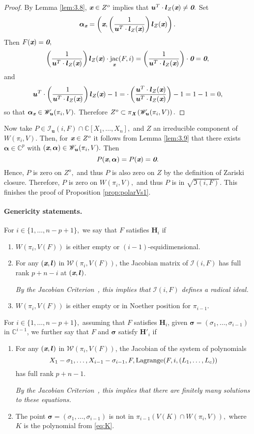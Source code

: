 \documentclass[a4paper]{article}
\def\bz{\textit{\textbf{0}}}
\def\Xb{\textit{\textbf{X}}}
\def\ub{{\bm u}}
\def\lb{{\bm l}}
\def\ax{\bm \alpha_{\xb}}
\def\xb{\textit{\textbf{x}}}
\DeclareMathOperator{\jac}{jac}
\DeclareMathOperator{\lag}{Lagrange}
\def\C{\mathbb{C}}
\def\Wi{W(\pi_i,V)}
\def\Iir{\sqrt{\mathfrak{I}(i,F)}}
\def\ji{\jac_{\xb}(F,i)}
\def\lagF{{\bm\lag}(F,i,(L_1,\hdots,L_c))}
\def\Iil{\mathscr{I}_{\ub}(i,F)}
\def\Wil{\mathscr{W}_{\ub}(\pi_i,V)}
\begin{document}
%
\begin{proof}
By Lemma \ref{lem:3.8}, $\xb \in Z^o$ implies that $\ub^T \cdot \lb_{Z}(\xb) \not = \bz.$ Set
\[
\bm \alpha_{\xb} = \left(\xb,\left(\frac{1}{\ub^T\cdot \lb_{Z}(\xb)}\right)\lb_{Z}(\xb)\right). 
\]
Then $F(\xb)=\bz,$
\begin{align*}
    \left(\frac{1}{\ub^T\cdot \lb_{Z}(\xb)}\right)\lb_{Z}(\xb)\cdot \ji = \left(\frac{1}{\ub^T\cdot \lb_{Z}(\xb)}\right)\cdot \bz = \bz,
\end{align*}
and
\[
\ub^T\cdot\left(\frac{1}{\ub^T\cdot \lb_{Z}(\xb)}\right)\lb_{Z}(\xb)-1 =
    \cdot\left(\frac{\ub^T\cdot\lb_{Z}(\xb)}{\ub^T\cdot \lb_{Z}(\xb)}\right)-1=1-1=0,
\]
so that $\ax \in \Wil.$ Therefore $Z^o \subset \pi_{\Xb}\left(\Wil\right).$
%
\end{proof}
%
%
%
\noindent 
Now take $P \in \Iil\cap \C[X_1,\hdots,X_n],$ and $Z$ an irreducible component of $\Wi.$ Then, for $\xb \in Z^o$ it follows from Lemma \ref{lem:3.9} that there exists $\bm \alpha \in \C^p$ with $(\xb, \bm \alpha) \in \Wil.$ Then 
\[
P(\xb, \bm \alpha) = P(\xb) = \bz.
\]
Hence, $P$ is zero on $Z^o,$ and thus $P$ is also zero on $Z$ by the definition of Zariski closure. Therefore, $P$ is zero on $\Wi,$ and thus $P$ is in $\Iir.$ This finishes the proof of Proposition \ref{prop:polarVs1}. 

\noindent
\paragraph*{Genericity statements.}
For $i \in \{1,\hdots,n-p+1\},$ we say that $F$ satisfies $\textbf{H}_i$ if
%
%
\begin{enumerate}
\item  $W(\pi_i,V(F))$ is either empty or $(i-1)$-equidimensional.
\item For any $(\xb,\lb)$ in $\mathscr{W}(\pi_i,V(F))$, the Jacobian matrix of $\mathscr{I}(i,F)$ has full rank $p+n-i$ at $(\xb,\lb)$.  

{\em By the Jacobian Criterion~\cite[Corollary 16.20]{ECA}, this
  implies that $\mathscr{I}(i,F)$ defines a radical ideal.}
\item $W(\pi_i,V(F))$ is either empty or in Noether position for
  $\pi_{i-1}$.
\smallskip
\end{enumerate}
%
\noindent 
For $i \in \{1,\hdots,n-p+1\},$ assuming that $F$ satisfies $\bm H_i$, given $\bm \sigma = (\sigma_1,\hdots,\sigma_{i-1})$ 
in $\C^{i-1}$, we further say that $F$ and $\bm \sigma$ satisfy
$\textbf{H}'_i$ if
\begin{enumerate}
\item For any $(\xb,\lb)$ in $\mathscr{W}(\pi_i,V(F))$, the Jacobian of the system of polynomials  
\[
 X_1-\sigma_1,\dots,X_{i-1}-\sigma_{i-1},F, \lagF
\]
has full rank $p+n-1$. 

{\em By the Jacobian Criterion~\cite[Corollary 16.20]{ECA}, this implies that there are finitely many solutions to these equations.}

\item The point $\bm \sigma = (\sigma_1,\hdots,\sigma_{i-1})$ is not in $ \pi_{i-1} (V(K) \cap W(\pi_i,V)),$ where $K$ is the polynomial from \ref{eq:K}.

\end{enumerate}
\end{document}
